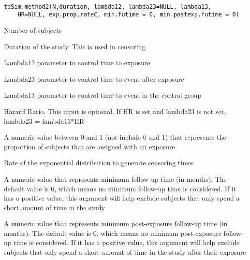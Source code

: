 \documentclass[a4paper]{book}
\begin{document}
%
\begin{Usage}
\begin{verbatim}

tdSim.method2(N,duration, lambda12, lambda23=NULL, lambda13, 
    HR=NULL, exp.prop,rateC, min.futime = 0, min.postexp.futime = 0)
\end{verbatim}
\end{Usage}
%
\begin{Arguments}
\begin{ldescription}
\item[\code{N}] 
Number of subjects

\item[\code{duration}] 
Duration of the study. This is used in censoring

\item[\code{lambda12}] 
Lambda12 parameter to control time to exposure

\item[\code{lambda23}] 
Lambda23 parameter to control time to event after exposure

\item[\code{lambda13}] 
Lambda13 parameter to control time to event in the control group

\item[\code{HR}] 
Hazard Ratio. This input is optional. If HR is set and lambda23 is not set, lambda23 = lambda13*HR

\item[\code{exp.prop}] 
A numeric value between 0 and 1 (not include 0 and 1) that represents the proportion of subjects that are assigned with an exposure

\item[\code{rateC}] 
Rate of the exponential distribution to generate censoring times

\item[\code{min.futime}] 
A numeric value that represents minimum follow-up time (in months). The default value is 0, which means no minimum follow-up time is considered. If it has a positive value, this argument will help exclude subjects that only spend a short amount of time in the study

\item[\code{min.postexp.futime}] 
A numeric value that represents minimum post-exposure follow-up time (in months). The default value is 0, which means no minimum post-exposure follow-up time is considered. If it has a positive value, this argument will help exclude subjects that only spend a short amount of time in the study after their exposure

\end{ldescription}
\end{Arguments}
\end{document}
